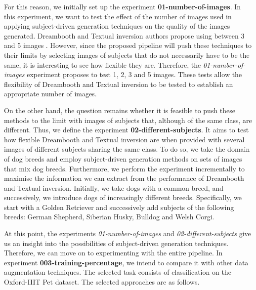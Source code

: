 For this reason, we initially set up the experiment \textbf{01-number-of-images}. In this experiment, we want to test the effect of the number of images used in applying subject-driven generation techniques on the quality of the images generated. Dreambooth and Textual inversion authors propose using between 3 and 5 images \cite{ruiz2022dreambooth, gal2022image}. However, since the proposed pipeline will push these techniques to their limits by selecting images of subjects that do not necessarily have to be the same, it is interesting to see how flexible they are. Therefore, the \textit{01-number-of-images} experiment proposes to test 1, 2, 3 and 5 images. These tests allow the flexibility of Dreambooth and Textual inversion to be tested to establish an appropriate number of images.

On the other hand, the question remains whether it is feasible to push these methods to the limit with images of subjects that, although of the same class, are different. Thus, we define the experiment \textbf{02-different-subjects}. It aims to test how flexible Dreambooth and Textual inversion are when provided with several images of different subjects sharing the same class. To do so, we take the domain of dog breeds and employ subject-driven generation methods on sets of images that mix dog breeds. Furthermore, we perform the experiment incrementally to maximise the information we can extract from the performance of Dreambooth and Textual inversion. Initially, we take dogs with a common breed, and successively, we introduce dogs of increasingly different breeds. Specifically, we start with a Golden Retriever and successively add subjects of the following breeds: German Shepherd, Siberian Husky, Bulldog and Welsh Corgi.

At this point, the experiments \textit{01-number-of-images} and \textit{02-different-subjects} give us an insight into the possibilities of subject-driven generation techniques. Therefore, we can move on to experimenting with the entire pipeline. In experiment \textbf{003-training-percentage}, we intend to compare it with other data augmentation techniques. The selected task consists of classification on the Oxford-IIIT Pet dataset. The selected approaches are as follows.

